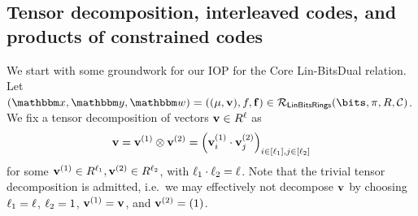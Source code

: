 \documentclass[11pt,letterpaper,usenames,dvipsnames]{article}
\begin{document}



%
%













%
\subsection{Tensor decomposition, interleaved codes, and products of constrained codes}\label{s:interleaved_setting}
%
\renewcommand{\ringmorphism}{\pi}

We start with some groundwork for our IOP for the Core Lin-BitsDual relation.  Let $(\inp,\oracle,\wit)=((\mu,\vv), f, \bff) \in \LinBitsDual(\bits,\ringmorphism, R,\cC)$. We fix a tensor decomposition of vectors $\mathbf{v}\in R^\ell$ as $$\mathbf{v} = \mathbf{v}^{(1)} \otimes \mathbf{v}^{(2)} = \left(\mathbf{v}_i^{(1)}\cdot \mathbf{v}_j^{(2)}\right)_{i\in [\ell_1], j\in [\ell_2]}$$ for some $\mathbf{v}^{(1)}\in R^{\ell_1}, \mathbf{v}^{(2)}\in R^{\ell_2}$, with $\ell_1 \cdot \ell_2=\ell$. Note that the trivial tensor decomposition is admitted, i.e.\ we may effectively not decompose $\mathbf{v}$ by choosing $\ell_1=\ell$, $\ell_2=1$, $\mathbf{v}^{(1)}=\mathbf{v}$, and $\mathbf{v}^{(2)} = (1)$.
\end{document}
